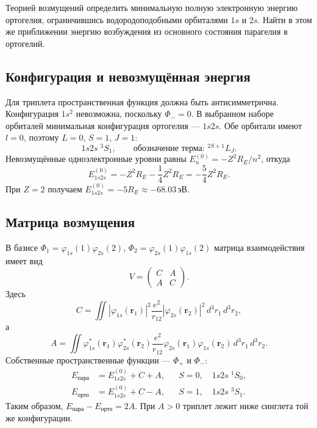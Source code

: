 \documentclass[../final.tex]{subfiles}
\begin{document}
\label{task:fiham5_ortho}

\condition
Теорией возмущений определить минимальную полную электронную энергию
ортогелия, ограничившись водородоподобными орбиталями $1s$ и $2s$.
Найти в этом же приближении энергию возбуждения из основного состояния
парагелия в ортогелий.

\solution

\subsection*{Конфигурация и невозмущённая энергия}

Для триплета пространственная функция должна быть антисимметрична.
Конфигурация $1s^2$ невозможна, поскольку $\Phi_-=0$.
В выбранном наборе орбиталей минимальная конфигурация ортогелия ---
$1s2s$. Обе орбитали имеют $l=0$, поэтому $L=0$, $S=1$, $J=1$:
\[
    1s2s\;{}^3S_1,
    \qquad \text{обозначение терма: }{}^{2S+1}L_J.
\]
Невозмущённые одноэлектронные уровни равны
$E_n^{(0)}=-Z^2R_E/n^2$, откуда
\[
    E_{1s2s}^{(0)}=-Z^2R_E-\frac14Z^2R_E
       =-\frac54Z^2R_E.
\]
При $Z=2$ получаем $E_{1s2s}^{(0)}=-5R_E\approx-68.03\,\text{эВ}$.

\subsection*{Матрица возмущения}

В базисе $\Phi_1=\varphi_{1s}(1)\varphi_{2s}(2)$,
$\Phi_2=\varphi_{2s}(1)\varphi_{1s}(2)$ матрица взаимодействия имеет вид
\[
    V=\begin{pmatrix}C&A\\A&C\end{pmatrix}.
\]
Здесь 
\[
    C=\iint |\varphi_{1s}(\mathbf r_1)|^2
       \frac{e^2}{r_{12}}|\varphi_{2s}(\mathbf r_2)|^2
       \,d^3r_1\,d^3r_2,
\]
а 
\[
    A=\iint\varphi_{1s}^*(\mathbf r_1)\varphi_{2s}^*(\mathbf r_2)
       \frac{e^2}{r_{12}}
       \varphi_{2s}(\mathbf r_1)\varphi_{1s}(\mathbf r_2)
       \,d^3r_1\,d^3r_2.
\]
Собственные пространственные функции --- $\Phi_+$ и $\Phi_-$:
\begin{align*}
    E_{\text{пара}}&=E_{1s2s}^{(0)}+C+A,
        &&S=0,\quad 1s2s\;{}^1S_0,\\
    E_{\text{орто}}&=E_{1s2s}^{(0)}+C-A,
        &&S=1,\quad 1s2s\;{}^3S_1.
\end{align*}
Таким образом, $E_{\text{пара}}-E_{\text{орто}}=2A$.
При $A>0$ триплет лежит ниже синглета той же конфигурации.
\end{document}
